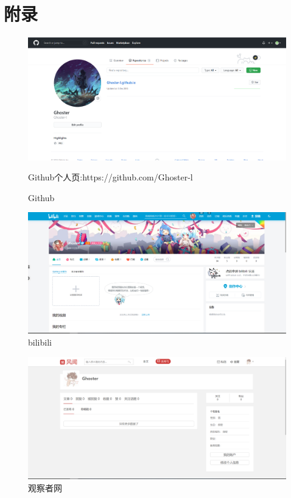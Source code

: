 \documentclass{article}
\begin{document}
\section{附录}
    \begin{figure}[ht]
        \centering
        \includegraphics[scale=0.15]{github}
		\caption{Github}
		Github个人页:https://github.com/Ghoster-l
     \end{figure}
	    \begin{figure}[ht]
		\centering
		\includegraphics[scale=0.15]{bilibili}
		\caption{bilibili}
	\end{figure}
    \begin{figure}[ht]
	\centering
	\includegraphics[scale=0.15]{guancha}
	\caption{观察者网}
	\end{figure}
\end{document}
